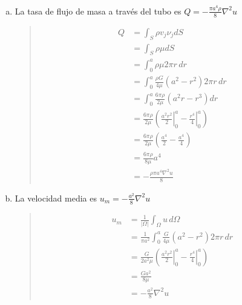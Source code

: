 \documentclass[a4paper,10pt,twoside,final,spanish]{article}
\begin{document}
\begin{enumerate}[a.]
\item La tasa de flujo de masa a través del tubo es $\displaystyle Q=-\frac{\pi a^{4}\rho}{8}\nabla^{2}u$

\begin{quote}
\begin{tcolorbox}[colback=gray!10!white,colframe=black!0!white]

\begin{align*}
Q &= \int_{S}\rho v_{j}\nu_{j}dS \\
&= \int_{S}\rho\mu dS \\
&= \int_{0}^{a}\rho\mu 2\pi r\,dr \\
&= \int_{0}^{a}\frac{\rho G}{4\mu}(a^{2}-r^{2})2\pi r\,dr \\
&= \int_{0}^{a}\frac{6\pi\rho}{2\mu}\left(a^{2}r-r^{3}\right)dr \\
&= \frac{6\pi\rho}{2\mu}\left(\left.\frac{a^{2}r^{2}}{2}\right|_{0}^{a}
-\left.\frac{r^{4}}{4}\right|_{0}^{a}\right) \\
&= \frac{6\pi\rho}{2\mu}\left(\frac{a^{4}}{2}-\frac{a^{4}}{4}\right) \\
&= \frac{6\pi\rho}{8\mu}a^{4} \\
&= -\frac{\rho\pi a^{4}\nabla^{2}u}{8}
\end{align*}

\end{tcolorbox}
\end{quote}

\item La velocidad media es $\displaystyle u_{m}=-\frac{a^{2}}{8}\nabla^{2}u$

\begin{quote}
\begin{tcolorbox}[colback=gray!10!white,colframe=black!0!white]

\begin{align*}
u_{m} &= \frac{1}{|\Omega|}\int_{\Omega}u\,d\Omega \\
&= \frac{1}{\pi a^{2}}\int_{0}^{a}\frac{G}{4\mu}(a^{2}-r^{2})2\pi r\,dr \\
&= \frac{G}{2a^{2}\mu}\left(\left.\frac{a^{2}r^{2}}{2}\right|_{0}^{a}
-\left.\frac{r^{4}}{4}\right|_{0}^{a}\right) \\
&= \frac{Ga^{2}}{8\mu} \\
&= -\frac{a^{2}}{8}\nabla^{2}u
\end{align*}

\end{tcolorbox}
\end{quote}


\end{enumerate}
\end{document}
